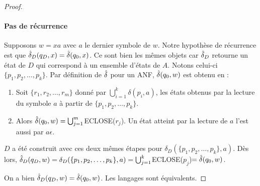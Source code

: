 \begin{proof}
	\paragraph{Pas de récurrence} Supposons $w=xa$ avec $a$ le dernier symbole de $w$. Notre hypothèse de récurrence est que $\hat{\delta}_D(q_D,x)=\hat{\delta}(q_0,x)$. Ce sont bien les mêmes objets car $\hat{\delta}_D$ retourne un état de $D$ qui correspond à un ensemble d'états de $A$. Notons celui-ci $\{p_1,p_2, \dots, p_k\}$. Par définition de $\hat{\delta}$ pour un ANF, $\hat{\delta}(q_0,w)$ est obtenu en :
	
	\begin{enumerate}
		\item Soit $\{r_1,r_2,\dots, r_m\}$ donné par $\bigcup_{i=1}^k \delta(p_i,a)$, les états obtenus par la lecture du symbole $a$ à partir de $\{p_1,p_2,\dots,p_k\}$.
		\item Alors $\hat{\delta}(q_0,w)=\bigcup_{j=1}^m$ECLOSE($r_j$). Un état atteint par la lecture de $a$ l'est aussi par $a\epsilon$.
	\end{enumerate}
	
	$D$ a été construit avec ces deux mêmes étapes pour $\delta_D(\{p_1,p_2,\dots, p_k\},a)$. Dès lors, $\hat{\delta}_D(q_D,w)=\delta_D(\{p_1,p_2,\dots, p_k\},a)=\bigcup_{j=1}^k$ECLOSE($p_j$)$=\hat{\delta}(q_0,w)$. 
	
	On a bien $\hat{\delta}_D(q_D,w)=\hat{\delta}(q_0,w)$. Les langages sont équivalents.
	
\end{proof}

